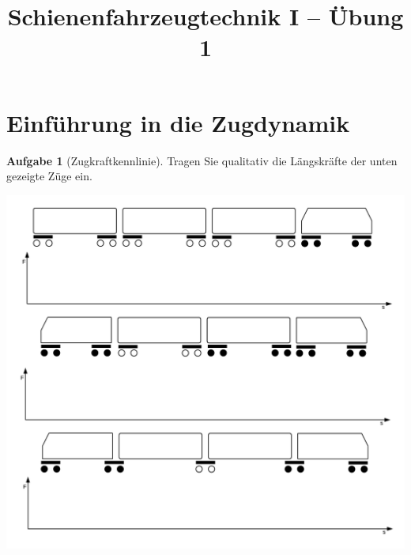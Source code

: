 \documentclass[10pt,a4paper,headsepline,smallheadings]{scrartcl}
\title{Schienenfahrzeugtechnik I  -- \"Ubung 1}
\date{}
\theoremstyle{definition}
\newtheorem{aufgabe}{Aufgabe}
\begin{document}
\thispagestyle{empty}
\maketitle
\vspace{-2cm}

\section*{Einf\"uhrung in die Zugdynamik}
\begin{aufgabe}[Zugkraftkennlinie] 
Tragen Sie qualitativ die L\"angskr\"afte der unten gezeigte Z\"uge ein.
\begin{center}
\includegraphics[width = .95\textwidth]{Laengskraefte}
\end{center}
\end{aufgabe}
\end{document}
